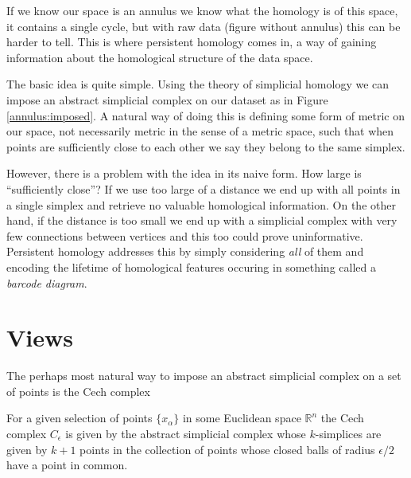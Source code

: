 If we know our space is an annulus we know what the homology is of this space, it contains a single cycle, but with raw data (figure without annulus) this can be harder to tell. This is where persistent homology comes in, a way of gaining information about the homological structure of the data space.

The basic idea is quite simple. Using the theory of simplicial homology we can impose an abstract simplicial complex on our dataset as in Figure \ref{annulus:imposed}. A natural way of doing this is defining some form of metric on our space, not necessarily metric in the sense of a metric space, such that when points are sufficiently close to each other we say they belong to the same simplex.

However, there is a problem with the idea in its naive form. How large is ``sufficiently close''? If we use too large of a distance we end up with all points in a single simplex and retrieve no valuable homological information. On the other hand, if the distance is too small we end up with a simplicial complex with very few connections between vertices and this too could prove uninformative. Persistent homology addresses this by simply considering \textit{all} of them and encoding the lifetime of homological features occuring in something called a \textit{barcode diagram}.





\section{Views}
The perhaps most natural way to impose an abstract simplicial complex on a set of points is the Cech complex
\begin{definition}
For a given selection of points $\{x_{\alpha}\}$ in some Euclidean space $\mathbb{R}^{n}$ the Cech complex $C_{\epsilon}$ is given by the abstract simplicial complex whose $k$-simplices are given by $k+1$ points in the collection of points whose closed balls of radius $\epsilon/2$ have a point in common.
\end{definition}

